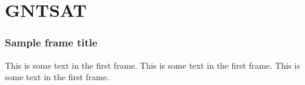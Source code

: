 \section{GNTSAT}

\begin{frame}
	\frametitle{Sample frame title}
	This is some text in the first frame. This is some text in the first frame.
	This is some text in the first frame.
\end{frame}
